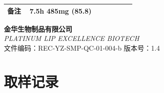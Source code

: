 \documentclass[UTF8,10pt,a4paper,fontset=fandol]{ctexart}
\newcommand{\fieldvalue}[1]{#1}
\newcommand{\handwritten}[1]{#1}
\begin{document}
\begin{center}
\begin{tabular}{|p{0.16\linewidth}|p{0.34\linewidth}|p{0.18\linewidth}|p{0.24\linewidth}|}
备注 &
\multicolumn{3}{p{0.76\linewidth}|}{
\fieldvalue{\handwritten{7.5h}}\qquad
\fieldvalue{\handwritten{485mg (85.8)}}
}
\\ \hline
\end{tabular}
\end{center}

\newpage

\begin{center}
\textbf{金华生物制品有限公司}\\
\textit{PLATINUM LIP EXCELLENCE BIOTECH}\\[2mm]
文件编码：REC-YZ-SMP-QC-01-004-b \qquad 版本号：1.4\\[2mm]
\section*{取样记录}
\end{center}
\end{document}
